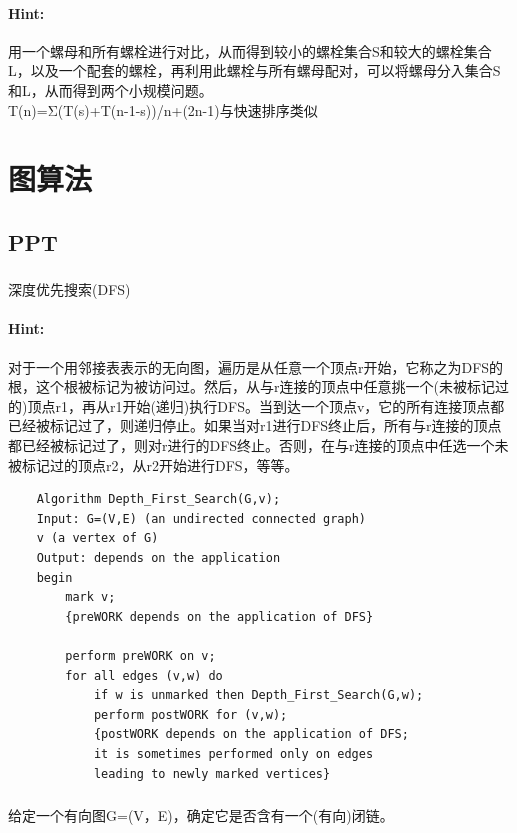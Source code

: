 \documentclass{article}
\begin{document}
     \paragraph{Hint:}用一个螺母和所有螺栓进行对比，从而得到较小的螺栓集合S和较大的螺栓集合L，以及一个配套的螺栓，再利用此螺栓与所有螺母配对，可以将螺母分入集合S和L，从而得到两个小规模问题。\\
     T(n)=Σ(T(s)+T(n-1-s))/n+(2n-1)与快速排序类似\\
     
     \section{图算法}
     \subsection{PPT}
     
     \subsubsection{}深度优先搜索(DFS)
     \paragraph{Hint:}对于一个用邻接表表示的无向图，遍历是从任意一个顶点r开始，它称之为DFS的根，这个根被标记为被访问过。然后，从与r连接的顶点中任意挑一个(未被标记过的)顶点r1，再从r1开始(递归)执行DFS。当到达一个顶点v，它的所有连接顶点都已经被标记过了，则递归停止。如果当对r1进行DFS终止后，所有与r连接的顶点都已经被标记过了，则对r进行的DFS终止。否则，在与r连接的顶点中任选一个未被标记过的顶点r2，从r2开始进行DFS，等等。
    
\lstset{language=C}
    \begin{lstlisting}
    Algorithm Depth_First_Search(G,v);
    Input: G=(V,E) (an undirected connected graph)
    v (a vertex of G)
    Output: depends on the application
    begin
        mark v;
        {preWORK depends on the application of DFS}
        
        perform preWORK on v; 
        for all edges (v,w) do
            if w is unmarked then Depth_First_Search(G,w);
            perform postWORK for (v,w);
            {postWORK depends on the application of DFS; 
            it is sometimes performed only on edges 
            leading to newly marked vertices}
      \end{lstlisting}
     
     \subsubsection{}给定一个有向图G=(V，E)，确定它是否含有一个(有向)闭链。
\end{document}
